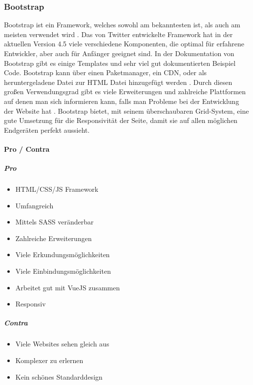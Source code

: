 		\subsubsection{Bootstrap}
		\label{chapter:study-frontend-frameworks-bootstrap}
		Bootstrap ist ein Framework, welches sowohl am bekanntesten ist, als auch am meisten verwendet wird \cite{introduction-bootstrap, learning-bootstrap}. Das von Twitter entwickelte Framework hat in der aktuellen Version 4.5 viele verschiedene Komponenten, die optimal für erfahrene Entwickler, aber auch für Anfänger geeignet sind. In der Dokumentation von Bootstrap gibt es einige Templates und sehr viel gut dokumentierten Beispiel Code\cite{introduction-bootstrap}. Bootstrap kann über einen Paketmanager, ein CDN, oder als heruntergeladene Datei zur HTML Datei hinzugefügt werden \cite{bootstrap-docu}. Durch diesen großen Verwendungsgrad gibt es viele Erweiterungen und zahlreiche Plattformen auf denen man sich informieren kann, falls man Probleme bei der Entwicklung der Website hat \cite{learning-bootstrap}. Bootstrap bietet, mit seinem überschaubaren Grid-System, eine gute Umsetzung für die Responsivität der Seite, damit sie auf allen möglichen Endgeräten perfekt aussieht.
		\paragraph{Pro / Contra}
		\subparagraph{Pro}
		\begin{itemize}
			\item HTML/CSS/JS Framework
			\item Umfangreich
			\item Mittels SASS veränderbar
			\item Zahlreiche Erweiterungen
			\item Viele Erkundungsmöglichkeiten
			\item Viele Einbindungsmöglichkeiten
			\item Arbeitet gut mit VueJS zusammen
			\item Responsiv
		\end{itemize}
	\label{list:bootstrappro}
		\subparagraph{Contra}
		\begin{itemize}
			\item Viele Websites sehen gleich aus
			\item Komplexer zu erlernen
			\item Kein schönes Standarddesign
		\end{itemize}
	\label{list:bootstrapcontra}
	
